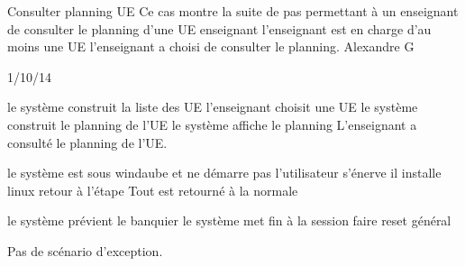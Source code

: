 
\startCU
\nom Consulter planning UE
\but Ce cas montre la suite de pas permettant à un enseignant de consulter le planning d'une UE
\acteur enseignant
\precondition l'enseignant est en charge d'au moins une UE
\declenchement l'enseignant a choisi de consulter le planning.
\auteur Alexandre G
\date 21/10/14

\nominal %
\startnominal
\etape[SA1] le système construit la liste des UE
\etape[RETOUR] l'enseignant choisit une UE
\etape le système construit le planning de l'UE
\etape[SA2] le système affiche le planning
\stopnominal
\postcondition L'enseignant a consulté le planning de l'UE.

\alternatifs %
\startalternatif[SA1] %
  \etape le système est sous windaube et ne démarre pas
  \etape l'utilisateur s'énerve
  \etape il installe linux
  \etape retour à l'étape \in[RETOUR]
\stopcondition
\postcondition Tout est retourné à la normale
\stopalternatif

\startalternatif[SA2]
  \etape le système prévient le banquier
  \etape le système met fin à la session
\stopcondition
{}
  \etape faire reset général
\stopcondition
\stopalternatif

\exception %
Pas de scénario d'exception.
\stopCU
